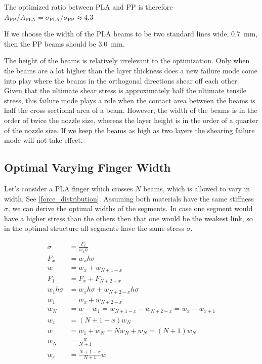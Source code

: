 The optimized ratio between PLA and PP is therefore
$
A_\text{PP} / A_\text{PLA} = \sigma_\text{PLA} / \sigma_\text{PP}  \approx 4.3
$

If we choose the width of the PLA beams to be two standard lines wide, \SI{0.7}{\milli\meter}, then the PP beams should be \SI{3.0}{\milli\meter}.




The height of the beams is relatively irrelevant to the optimization.
Only when the beams are a lot higher than the layer thickness does a new failure mode come into play where the beams in the orthogonal directions shear off each other.
Given that the ultimate shear stress is approximately half the ultimate tensile stress,
this failure mode plays a role when the contact area between the beams is half the cross sectional area of a beam.
However, the width of the beams is in the order of twice the nozzle size, whereas the layer height is in the order of a quarter of the nozzle size.
If we keep the beams as high as two layers the shearing failure mode will not take effect.


\subsection{Optimal Varying Finger Width}

Let's consider a PLA finger which crosses $N$ beams, which is allowed to vary in width.
See \cref{force_distribution}.
Assuming both materials have the same stiffness $\sigma$, we can derive the optimal widths of the segments.
In case one segment would have a higher stress than the others then that one would be the weakest link, so in the optimal structure all segments have the same stress $\sigma$.

\begin{align*}
    \sigma &= \frac{F_x}{w_x h} \\
    F_x &= w_x h\sigma \\
    w &= w_x + w_{N+1-x} \\
    F_1 &= F_x + F_{N+2-x} \\
    w_1 h \sigma &= w_x h \sigma + w_{N+2-x} h \sigma \\
    w_1 &= w_x + w_{N+2-x} \\
    w_N &= w - w _1 = w_{N+1-x} - w_{N+2-x} = w_x - w_{x+1} \\
    w_x &= (N + 1 - x)  w_N \\
    w &= w_1 + w_N = N w_N  + w_N = (N+1) w_N\\
    w_N &= \frac{w}{N+1} \\
    w_x &= \frac{N + 1 - x}{N+1} w
\end{align*}

